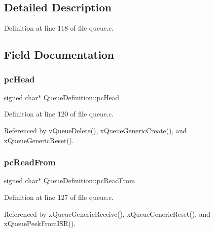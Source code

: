 \subsection{Detailed Description}


Definition at line 118 of file queue.\+c.



\subsection{Field Documentation}
\mbox{\label{structQueueDefinition_ae27bcbc6d35f837dedc62321501daa49}} 
\subsubsection{\texorpdfstring{pc\+Head}{pcHead}}
{\footnotesize\ttfamily signed char$\ast$ Queue\+Definition\+::pc\+Head}



Definition at line 120 of file queue.\+c.



Referenced by v\+Queue\+Delete(), x\+Queue\+Generic\+Create(), and x\+Queue\+Generic\+Reset().

\mbox{\label{structQueueDefinition_a6fd0b7b0b51bb9654cdf0899bdaa4936}} 
\subsubsection{\texorpdfstring{pc\+Read\+From}{pcReadFrom}}
{\footnotesize\ttfamily signed char$\ast$ Queue\+Definition\+::pc\+Read\+From}



Definition at line 127 of file queue.\+c.



Referenced by x\+Queue\+Generic\+Receive(), x\+Queue\+Generic\+Reset(), and x\+Queue\+Peek\+From\+I\+S\+R().

\mbox{\label{structQueueDefinition_a107296146c82cd122e0ba0756fb89c9d}} 

